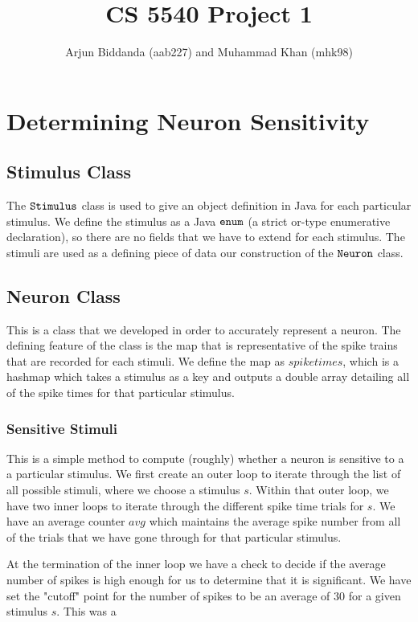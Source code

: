 \documentclass[12pt]{article} %
\title{CS 5540 Project 1}
\author{Arjun Biddanda (aab227) and Muhammad Khan (mhk98)}
\begin{document}
\maketitle

\section{Determining Neuron Sensitivity}
\subsection{Stimulus Class}
The $\tt{Stimulus}$ class is used to give an object definition in Java for each particular stimulus. We define the stimulus as a Java $\tt{enum}$ (a strict or-type enumerative declaration), so there are no fields that we have to extend for each stimulus. The stimuli are used as a defining piece of data our construction of the $\tt{Neuron}$ class.

\subsection{Neuron Class}
This is a class that we developed in order to accurately represent a neuron. The defining feature of the class is the map that is representative of the spike trains that are recorded for each stimuli. We define the map as $spiketimes$, which is a hashmap which takes a stimulus as a key and outputs a double array detailing all of the spike times for that particular stimulus. 
\subsubsection{Sensitive Stimuli}
This is a simple method to compute (roughly) whether a neuron is sensitive to a a particular stimulus. We first create an outer loop to iterate through the list of all possible stimuli, where we choose a stimulus $s$. Within that outer loop, we have two inner loops to iterate through the different spike time trials for $s$. We have an average counter $avg$ which maintains the average spike number from all of the trials that we have gone through for that particular stimulus. 

At the termination of the inner loop we have a check to decide if the average number of spikes is high enough for us to determine that it is significant. We have set the "cutoff" point for the number of spikes to be an average of 30 for a given stimulus $s$. This was a 
\end{document}
